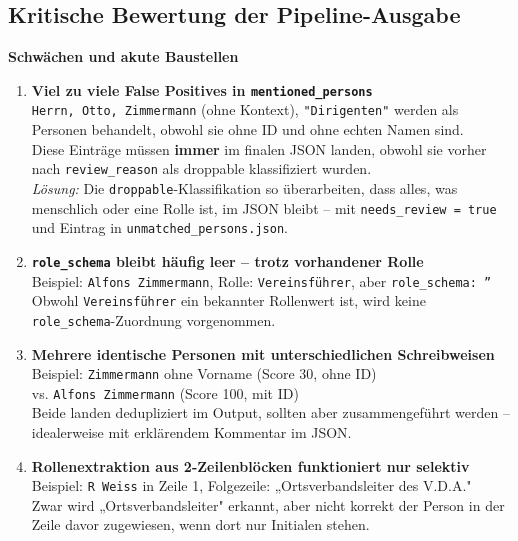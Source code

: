 \documentclass{article}
\begin{document}
\subsection*{Kritische Bewertung der Pipeline-Ausgabe}

\textbf{Schwächen und akute Baustellen}
\begin{enumerate}
    \item \textbf{Viel zu viele False Positives in \texttt{mentioned\_persons}}\\
    \texttt{Herrn, Otto, Zimmermann} (ohne Kontext), \texttt{"Dirigenten"} \textrightarrow{} werden als Personen behandelt, obwohl sie ohne ID und ohne echten Namen sind.\\
    Diese Einträge müssen \textbf{immer} im finalen JSON landen, obwohl sie vorher nach \texttt{review\_reason} als droppable klassifiziert wurden.\\
    \textit{Lösung:} Die \texttt{droppable}-Klassifikation so überarbeiten, dass alles, was menschlich oder eine Rolle ist, im JSON bleibt – mit \verb|needs_review = true| und Eintrag in \texttt{unmatched\_persons.json}.
    
    \item \textbf{\texttt{role\_schema} bleibt häufig leer – trotz vorhandener Rolle}\\
    Beispiel: \texttt{Alfons Zimmermann}, Rolle: \texttt{Vereinsführer}, aber \texttt{role\_schema: ''}\\
    Obwohl \texttt{Vereinsführer} ein bekannter Rollenwert ist, wird keine \texttt{role\_schema}-Zuordnung vorgenommen.
    
    \item \textbf{Mehrere identische Personen mit unterschiedlichen Schreibweisen}\\
    Beispiel: \texttt{Zimmermann} ohne Vorname (Score 30, ohne ID)\\
    vs. \texttt{Alfons Zimmermann} (Score 100, mit ID)\\
    Beide landen dedupliziert im Output, sollten aber zusammengeführt werden – idealerweise mit erklärendem Kommentar im JSON.
    
    \item \textbf{Rollenextraktion aus 2-Zeilenblöcken funktioniert nur selektiv}\\
    Beispiel: \texttt{R Weiss} in Zeile 1, Folgezeile: „Ortsverbandsleiter des V.D.A."\\
    Zwar wird „Ortsverbandsleiter" erkannt, aber nicht korrekt der Person in der Zeile davor zugewiesen, wenn dort nur Initialen stehen.
    

\end{enumerate}
\end{document}

